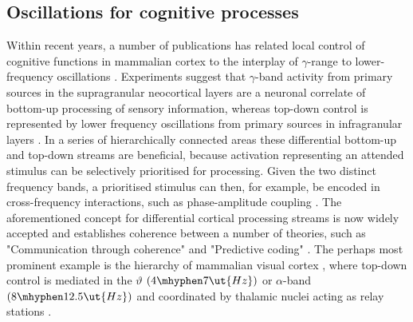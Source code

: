 \subsection{Oscillations for cognitive processes}
Within recent years, a number of publications has related local control of cognitive functions in mammalian cortex to the interplay of $\gamma$-range to lower-frequency oscillations \citep{Fries2015,Bastos2015}. 
Experiments suggest that $\gamma$-band activity from primary sources in the supragranular neocortical layers are a neuronal correlate of bottom-up processing of sensory information, whereas top-down control is represented by lower frequency oscillations from primary sources in infragranular layers \citep[Results, 2nd par]{Bollimunta2011a} \citep[p4, upper left]{VanKerkoerle}.
In a series of hierarchically connected areas these differential bottom-up and top-down streams are beneficial, because activation representing an attended stimulus can be selectively prioritised for processing. Given the two distinct frequency bands, a prioritised stimulus can then, for example, be encoded in cross-frequency interactions, such as phase-amplitude coupling \citep[1st only mentions FA-coupling, 2nd describes the processing in streams]{Jensen,Spaak2012,Osipova2008,Jensen2014}.
The aforementioned concept for differential cortical processing streams is now widely accepted and establishes coherence between a number of theories, such as "Communication through coherence" \citep{Fries2005} and "Predictive coding" \citep{Bastos2012}.
The perhaps most prominent example is the hierarchy of mammalian visual cortex \citep{Felleman91_1}, where top-down control is mediated in the $\vartheta$ $(4\mhyphen7\ut{Hz})$ or $\alpha$-band $(8\mhyphen12.5\ut{Hz})$ \citep[focusses on theta, but Bastos 2015 also mentions $\alpha$]{AndreMoraesBastos2015} and coordinated by thalamic nuclei acting as relay stations \citep[last page bottom]{Jensen2014, Saalmann2012}.

